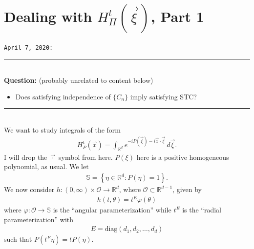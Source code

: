 \documentclass{article}
\theoremstyle{definition}
\newcommand{\lc}{\left\{}
\newcommand{\rc}{\right\}}
\begin{document}
\newpage





\section{Dealing with $H_\Pi^t(\vec{\xi})$, Part 1}

\texttt{April 7, 2020:} \\
\hrule
$\,$\\
\textbf{Question:} (probably unrelated to content below)
\begin{itemize}
    \item Does satisfying independence of $\{C_n\}$ imply satisfying STC?
\end{itemize}
\hrule
$\,$\\
\noindent We want to study integrals of the form
\begin{align*}
    H_P^t(\vec{x}) = \int_{\mathbb{R}^d} e^{-iP(\vec{\xi}) - i \vec{x}\cdot \vec{\xi}}\,d{\vec{\xi}}.
\end{align*}
I will drop the $\vec{\cdot}$ symbol from here. $P(\xi)$ here is a positive homogeneous polynomial, as usual. We let
\begin{align*}
    \mathbb{S} = \lc \eta \in \mathbb{R}^d : P(\eta) = 1\rc.
\end{align*}
We now consider $h: (0,\infty) \times \mathcal{O} \to \mathbb{R}^d$, where $\mathcal{O} \subset \mathbb{R}^{d-1}$, given by
\begin{align*}
    h(t,\theta) = t^E \varphi(\theta)
\end{align*}
where $\varphi: \mathcal{O} \to \mathbb{S}$ is the ``angular parameterization'' while $t^E$ is the ``radial parameterization'' with 
\begin{align*}
    E = \mbox{diag}(d_1,d_2,\dots,d_d)
\end{align*}
such that $P(t^E \eta) = tP(\eta)$.\\
\end{document}
